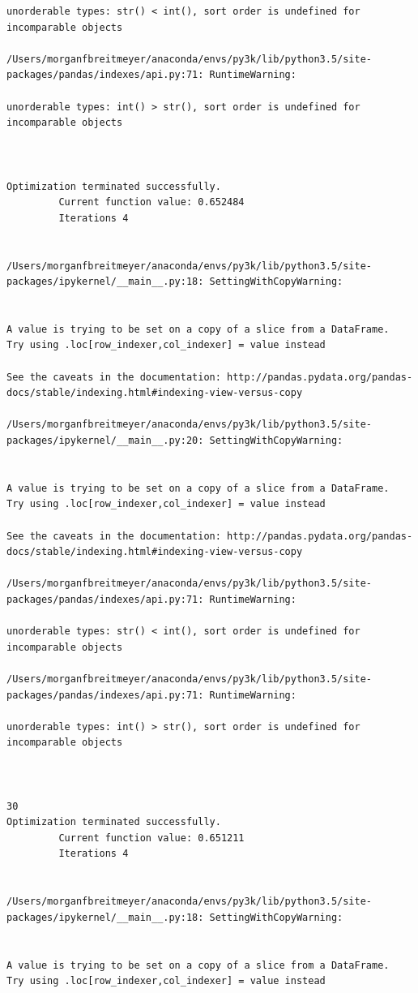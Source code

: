 \begin{lstlisting}
unorderable types: str() < int(), sort order is undefined for incomparable objects

/Users/morganfbreitmeyer/anaconda/envs/py3k/lib/python3.5/site-packages/pandas/indexes/api.py:71: RuntimeWarning:

unorderable types: int() > str(), sort order is undefined for incomparable objects



Optimization terminated successfully.
         Current function value: 0.652484
         Iterations 4


/Users/morganfbreitmeyer/anaconda/envs/py3k/lib/python3.5/site-packages/ipykernel/__main__.py:18: SettingWithCopyWarning:


A value is trying to be set on a copy of a slice from a DataFrame.
Try using .loc[row_indexer,col_indexer] = value instead

See the caveats in the documentation: http://pandas.pydata.org/pandas-docs/stable/indexing.html#indexing-view-versus-copy

/Users/morganfbreitmeyer/anaconda/envs/py3k/lib/python3.5/site-packages/ipykernel/__main__.py:20: SettingWithCopyWarning:


A value is trying to be set on a copy of a slice from a DataFrame.
Try using .loc[row_indexer,col_indexer] = value instead

See the caveats in the documentation: http://pandas.pydata.org/pandas-docs/stable/indexing.html#indexing-view-versus-copy

/Users/morganfbreitmeyer/anaconda/envs/py3k/lib/python3.5/site-packages/pandas/indexes/api.py:71: RuntimeWarning:

unorderable types: str() < int(), sort order is undefined for incomparable objects

/Users/morganfbreitmeyer/anaconda/envs/py3k/lib/python3.5/site-packages/pandas/indexes/api.py:71: RuntimeWarning:

unorderable types: int() > str(), sort order is undefined for incomparable objects



30
Optimization terminated successfully.
         Current function value: 0.651211
         Iterations 4


/Users/morganfbreitmeyer/anaconda/envs/py3k/lib/python3.5/site-packages/ipykernel/__main__.py:18: SettingWithCopyWarning:


A value is trying to be set on a copy of a slice from a DataFrame.
Try using .loc[row_indexer,col_indexer] = value instead


\end{lstlisting}
